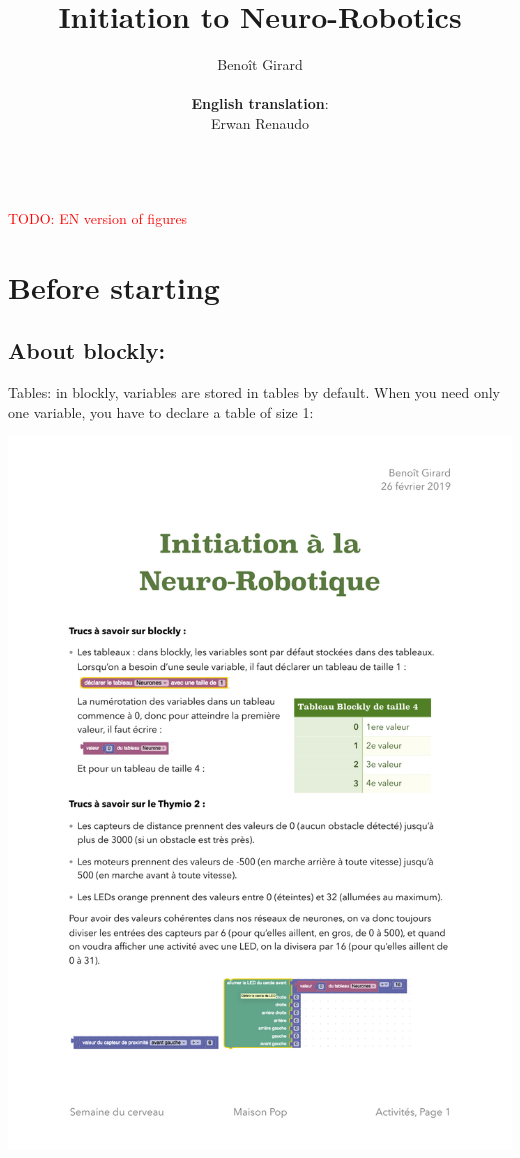 \documentclass[12pt]{article}
\title{Initiation to Neuro-Robotics}
\author{Beno\^{i}t Girard\\\\\textbf{English translation}:\\ Erwan Renaudo}
\date{}
\begin{document}
\maketitle

\tableofcontents


~\\
\textcolor{red}{TODO: EN version of figures}

\section*{Before starting}
\subsection*{About blockly:}

Tables: in blockly, variables are stored in tables by default. When you need only one variable, you have to declare a table of size 1:

\includegraphics{../DeclarationTableau.pdf}
\end{document}
